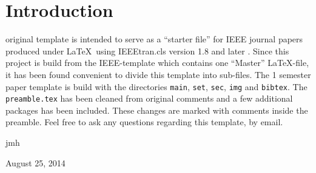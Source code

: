 
\section{Introduction}
 original template is intended to serve as a ``starter file''
for IEEE journal papers produced under \LaTeX\ using
IEEEtran.cls version 1.8 and later \cite{IEEEhowto:IEEEtranpage}. Since this project is build from the IEEE-template which contains one ``Master'' \LaTeX-file, it has been found convenient to divide this template into sub-files. The 1 semester paper template is build with the directories \texttt{main}, \texttt{set}, \texttt{sec}, \texttt{img} and \texttt{bibtex}. The \texttt{preamble.tex} has been cleaned from original comments and a few additional packages has been included. These changes are marked with comments inside the preamble. Feel free to ask any questions regarding this template, by email.


\hfill jmh
 
\hfill August 25, 2014




% 
% 
% 
% 
